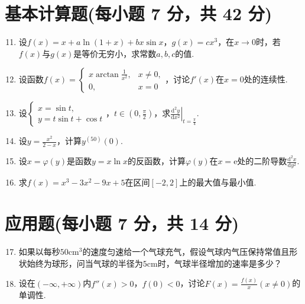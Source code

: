 \documentclass[../main.tex]{subfiles}
\begin{document}
\section{基本计算题(每小题 7 分，共 42 分)}
\begin{enumerate}
    \setcounter{enumi}{10}
    \item 设$f(x)=x+a\ln(1+x)+bx\sin x$，$g(x)=cx^{3}$，在$x\to0$时，若$f(x)$与$g
              (x)$是等价无穷小，求常数$a,b,c$的值.
          \vspace{8em}

    \item 设函数$f(x)=
              \begin{cases}
                  x\arctan\frac{1}{x^{2}}, & x\neq0, \\
                  0,                       & x=0
              \end{cases}$，讨论$f'(x)$在$x=0$处的连续性.
          \vspace{8em}

    \item 设$\begin{cases}
                  x=\sin t, \\
                  y=t\sin t+\cos t
              \end{cases}$，$t\in\left(0,\frac{\pi}{2}\right)$，求$\left.\frac{\mathrm{d}^{2}
                  y}{\mathrm{d}x^{2}}\right|_{t=\frac{\pi}{4}}$.
          \vspace{8em}

    \item 设$y=\frac{x^{2}}{2-x}$，计算$y^{(50)}(0)$.
          \vspace{10em}

    \item 设$x=\varphi(y)$是函数$y=x\ln x$的反函数，计算$\varphi(y)$在$x=\mathrm{e}$处的二阶导数$\frac{\mathrm{d}^{2}
                  x}{\mathrm{d}y^{2}}$.
          \vspace{12em}

    \item 求$f(x)=x^{3}-3x^{2}-9x+5$在区间$[-2,2]$上的最大值与最小值.
          \vspace{12em}
\end{enumerate}

\section{应用题(每小题 7 分，共 14 分)}
\begin{enumerate}
    \setcounter{enumi}{16}
    \item 如果以每秒$50\mathrm{cm}^{3}$的速度匀速给一个气球充气，假设气球内气压保持常值且形状始终为球形，问当气球的半径为$5
              \mathrm{cm}$时，气球半径增加的速率是多少？
          \vspace{15em}

    \item 设在$\left(-\infty,+\infty\right)$内$f''(x)>0$，$f(0)<0$，讨论$F(x
              )=\frac{f(x)}{x}(x\neq0)$的单调性.
          \vspace{15em}
\end{enumerate}
\end{document}
